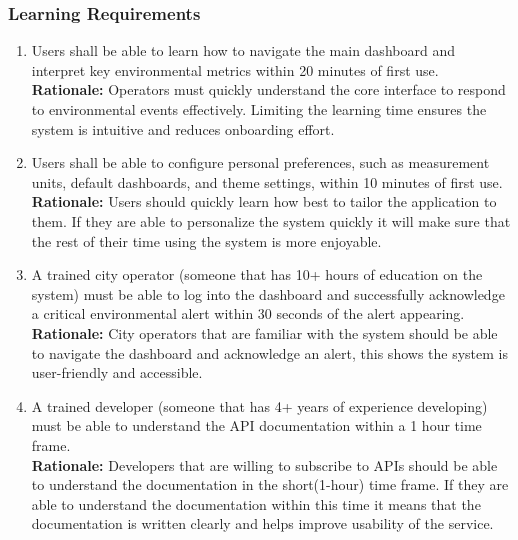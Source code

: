 \documentclass[]{article}
\begin{document}
\subsubsection{Learning Requirements}
\label{ssub:learning_requirements}
\begin{enumerate}[{UH-L}1. ]
	\item Users shall be able to learn how to navigate the main dashboard and interpret key environmental metrics within 20 minutes of first use.\\
	\textbf{Rationale:} Operators must quickly understand the core interface to respond to environmental events effectively. Limiting the learning time ensures the system is intuitive and reduces onboarding effort.
	\item Users shall be able to configure personal preferences, such as measurement units, default dashboards, and theme settings, within 10 minutes of first use.\\
	\textbf{Rationale:} Users should quickly learn how best to tailor the application to them. If they are able to personalize the system quickly it will make sure that the rest of their time using the system is more enjoyable.
    \item A trained city operator (someone that has 10+ hours of education on the system) must be able to log into the dashboard and successfully acknowledge a critical environmental alert within 30 seconds of the alert appearing.\\
	\textbf{Rationale:} City operators that are familiar with the system should be able to navigate the dashboard and acknowledge an alert, this shows the system is user-friendly and accessible.
    \item A trained developer (someone that has 4+ years of experience developing) must be able to understand the API documentation within a 1 hour time frame.\\
	\textbf{Rationale:} Developers that are willing to subscribe to APIs should be able to understand the documentation in the short(1-hour) time frame. If they are able to understand the documentation within this time it means that the documentation is written clearly and helps improve usability of the service.
\end{enumerate}
\end{document}
